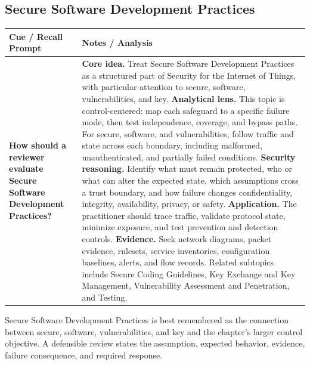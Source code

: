 \documentclass[11pt]{article}
\newcommand{\CornellHeader}{%
\rowcolor{Navy}\color{white}\bfseries Cue / Recall Prompt & \color{white}\bfseries Notes / Analysis\\\hline}
\newcommand{\CornellRow}[2]{%
\cellcolor{CueGray}\RaggedRight\textbf{#1} & \RaggedRight #2\\\hline}
\begin{document}
\subsection*{Secure Software Development Practices}
\begin{longtable}{>{\RaggedRight\arraybackslash}p{}|>{\RaggedRight\arraybackslash}p{}}
\CornellHeader
\CornellRow{How should a reviewer evaluate Secure Software Development Practices?}{\textbf{Core idea.} Treat Secure Software Development Practices as a structured part of Security for the Internet of Things, with particular attention to secure, software, vulnerabilities, and key. \textbf{Analytical lens.} This topic is control-centered: map each safeguard to a specific failure mode, then test independence, coverage, and bypass paths. For secure, software, and vulnerabilities, follow traffic and state across each boundary, including malformed, unauthenticated, and partially failed conditions. \textbf{Security reasoning.} Identify what must remain protected, who or what can alter the expected state, which assumptions cross a trust boundary, and how failure changes confidentiality, integrity, availability, privacy, or safety. \textbf{Application.} The practitioner should trace traffic, validate protocol state, minimize exposure, and test prevention and detection controls. \textbf{Evidence.} Seek network diagrams, packet evidence, rulesets, service inventories, configuration baselines, alerts, and flow records. Related subtopics include Secure Coding Guidelines, Key Exchange and Key Management, Vulnerability Assessment and Penetration, and Testing.}
\end{longtable}
\begin{topicsummary}
Secure Software Development Practices is best remembered as the connection between secure, software, vulnerabilities, and key and the chapter's larger control objective. A defensible review states the assumption, expected behavior, evidence, failure consequence, and required response.
\end{topicsummary}
\end{document}
